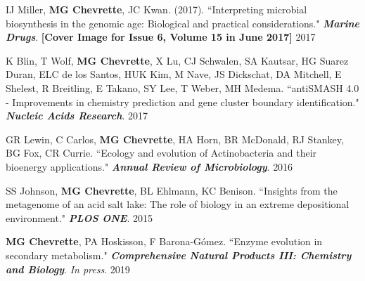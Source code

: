 \begin{cvpubs}
\cvpub
{IJ Miller, \textbf{MG Chevrette}, JC Kwan. (2017). ``Interpreting microbial biosynthesis in the genomic age: Biological and practical considerations." \textit{\textbf{Marine Drugs}}. \textbf{\textit{}} \linebreak \textbf{[Cover Image for Issue 6, Volume 15 in June 2017]}}
{2017}

\cvpub
{K Blin, T Wolf, \textbf{MG Chevrette}, X Lu, CJ Schwalen, SA Kautsar, HG Suarez Duran, ELC de los Santos, HUK Kim, M Nave, JS Dickschat, DA Mitchell, E Shelest, R Breitling, E Takano, SY Lee, T Weber, MH Medema. ``antiSMASH 4.0 - Improvements in chemistry prediction and gene cluster boundary identification." \textit{\textbf{Nucleic Acids Research}}. \textbf{\textit{}}}
{2017}

\cvpub
{GR Lewin, C Carlos, \textbf{MG Chevrette}, HA Horn, BR McDonald, RJ Stankey, BG Fox, CR Currie. ``Ecology and evolution of Actinobacteria and their bioenergy applications." \textit{\textbf{Annual Review of Microbiology}}. \textbf{\textit{}}}
{2016}

\cvpub
{SS Johnson, \textbf{MG Chevrette}, BL Ehlmann, KC Benison. ``Insights from the metagenome of an acid salt lake: The role of biology in an extreme depositional environment."  \textit{\textbf{PLOS ONE}}. \textbf{\textit{}}}
{2015}

\end{cvpubs}


\begin{cvpubs}

\cvpub
{\textbf{MG Chevrette}, PA Hoskisson, F Barona-G\'{o}mez. ``Enzyme evolution in secondary metabolism." \textit{\textbf{Comprehensive Natural Products III: Chemistry and Biology}}. \textit{In press}.}
{2019}

\end{cvpubs}


